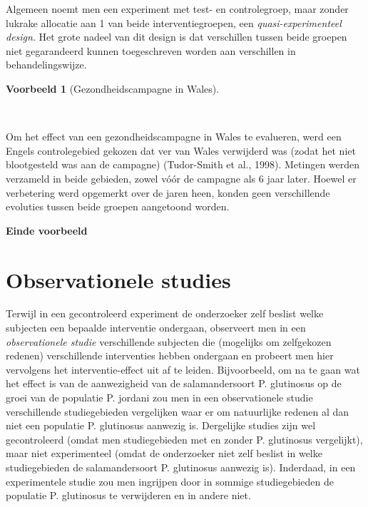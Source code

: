 \documentclass[
  dutch,
  letterpaper,
  12pt]{book}
\theoremstyle{definition}
\theoremstyle{definition}
\theoremstyle{definition}
\newtheorem{example}{Voorbeeld}[chapter]
\theoremstyle{remark}
\begin{document}
Algemeen noemt men een experiment met test- en controlegroep, maar
zonder lukrake allocatie aan 1 van beide interventiegroepen, een
\emph{quasi-experimenteel design}. Het grote nadeel van dit design is
dat verschillen tussen beide groepen niet gegarandeerd kunnen
toegeschreven worden aan verschillen in behandelingswijze.

\begin{example}[Gezondheidscampagne in
Wales]\protect\hypertarget{exm-gezondheidscampagne-in-wales}{}\label{exm-gezondheidscampagne-in-wales}

~

\end{example}

Om het effect van een gezondheidscampagne in Wales te evalueren, werd
een Engels controlegebied gekozen dat ver van Wales verwijderd was
(zodat het niet blootgesteld was aan de campagne) (Tudor-Smith et al.,
1998). Metingen werden verzameld in beide gebieden, zowel vóór de
campagne als 6 jaar later. Hoewel er verbetering werd opgemerkt over de
jaren heen, konden geen verschillende evoluties tussen beide groepen
aangetoond worden.

\textbf{Einde voorbeeld}

\section{Observationele studies}\label{sec-observational}

Terwijl in een gecontroleerd experiment de onderzoeker zelf beslist
welke subjecten een bepaalde interventie ondergaan, observeert men in
een \emph{observationele studie} verschillende subjecten die (mogelijks
om zelfgekozen redenen) verschillende interventies hebben ondergaan en
probeert men hier vervolgens het interventie-effect uit af te leiden.
Bijvoorbeeld, om na te gaan wat het effect is van de aanwezigheid van de
salamandersoort P. glutinosus op de groei van de populatie P. jordani
zou men in een observationele studie verschillende studiegebieden
vergelijken waar er om natuurlijke redenen al dan niet een populatie P.
glutinosus aanwezig is. Dergelijke studies zijn wel gecontroleerd (omdat
men studiegebieden met en zonder P. glutinosus vergelijkt), maar niet
experimenteel (omdat de onderzoeker niet zelf beslist in welke
studiegebieden de salamandersoort P. glutinosus aanwezig is). Inderdaad,
in een experimentele studie zou men ingrijpen door in sommige
studiegebieden de populatie P. glutinosus te verwijderen en in andere
niet.
\end{document}
